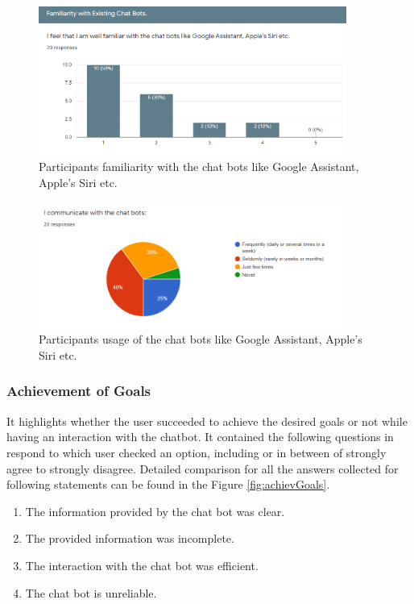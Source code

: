 \begin{figure}[!h]
    \centering
    \includegraphics[width=0.9\textwidth]{img/Familiraity.PNG}
    \caption{Participants familiarity with the chat bots like Google Assistant, Apple's Siri etc.}
    \label{fig:familiarity}
\end{figure}

\begin{figure}[!h]
    \centering
    \includegraphics[width=0.9\textwidth]{img/Communicate_Chatbots_Result.PNG}
    \caption{Participants usage of the chat bots like Google Assistant, Apple's Siri etc.}
    \label{fig:commChatRes}
\end{figure}

\subsubsection*{Achievement of Goals}
It highlights whether the user succeeded to achieve the desired goals or not while having an interaction with the chatbot. It contained the following questions in respond to which user checked an option, including or in between of strongly agree to strongly disagree. Detailed comparison for all the answers collected for following statements can be found in the Figure \ref{fig:achievGoals}.
\begin{enumerate}
    \item The information provided by the chat bot was clear.
    \item The provided information was incomplete.
    \item The interaction with the chat bot was efficient.
    \item The chat bot is unreliable.
\end{enumerate}

